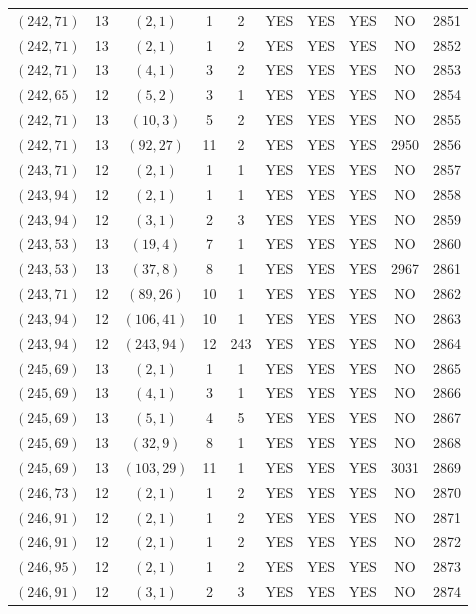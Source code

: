 \begin{longtable}{|c|c|c|c|c|c|c|c|c|c|}
$(242, 71)$ & 13 & $(2, 1)$ & 1 & 2 & YES & YES & YES & NO & 2851\\
$(242, 71)$ & 13 & $(2, 1)$ & 1 & 2 & YES & YES & YES & NO & 2852\\
$(242, 71)$ & 13 & $(4, 1)$ & 3 & 2 & YES & YES & YES & NO & 2853\\
$(242, 65)$ & 12 & $(5, 2)$ & 3 & 1 & YES & YES & YES & NO & 2854\\
$(242, 71)$ & 13 & $(10, 3)$ & 5 & 2 & YES & YES & YES & NO & 2855\\
$(242, 71)$ & 13 & $(92, 27)$ & 11 & 2 & YES & YES & YES & 2950 & 2856\\
$(243, 71)$ & 12 & $(2, 1)$ & 1 & 1 & YES & YES & YES & NO & 2857\\
$(243, 94)$ & 12 & $(2, 1)$ & 1 & 1 & YES & YES & YES & NO & 2858\\
$(243, 94)$ & 12 & $(3, 1)$ & 2 & 3 & YES & YES & YES & NO & 2859\\
$(243, 53)$ & 13 & $(19, 4)$ & 7 & 1 & YES & YES & YES & NO & 2860\\
$(243, 53)$ & 13 & $(37, 8)$ & 8 & 1 & YES & YES & YES & 2967 & 2861\\
$(243, 71)$ & 12 & $(89, 26)$ & 10 & 1 & YES & YES & YES & NO & 2862\\
$(243, 94)$ & 12 & $(106, 41)$ & 10 & 1 & YES & YES & YES & NO & 2863\\
$(243, 94)$ & 12 & $(243, 94)$ & 12 & 243 & YES & YES & YES & NO & 2864\\
$(245, 69)$ & 13 & $(2, 1)$ & 1 & 1 & YES & YES & YES & NO & 2865\\
$(245, 69)$ & 13 & $(4, 1)$ & 3 & 1 & YES & YES & YES & NO & 2866\\
$(245, 69)$ & 13 & $(5, 1)$ & 4 & 5 & YES & YES & YES & NO & 2867\\
$(245, 69)$ & 13 & $(32, 9)$ & 8 & 1 & YES & YES & YES & NO & 2868\\
$(245, 69)$ & 13 & $(103, 29)$ & 11 & 1 & YES & YES & YES & 3031 & 2869\\
$(246, 73)$ & 12 & $(2, 1)$ & 1 & 2 & YES & YES & YES & NO & 2870\\
$(246, 91)$ & 12 & $(2, 1)$ & 1 & 2 & YES & YES & YES & NO & 2871\\
$(246, 91)$ & 12 & $(2, 1)$ & 1 & 2 & YES & YES & YES & NO & 2872\\
$(246, 95)$ & 12 & $(2, 1)$ & 1 & 2 & YES & YES & YES & NO & 2873\\
$(246, 91)$ & 12 & $(3, 1)$ & 2 & 3 & YES & YES & YES & NO & 2874\\

\end{longtable}
